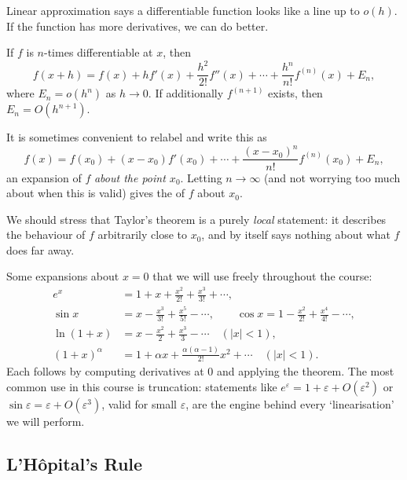 Linear approximation says a differentiable function looks like a line up to $o(h)$. If the function has more derivatives, we can do better.

\begin{theorem}
	If $f$ is $n$-times differentiable at $x$, then
	$$
	f(x + h) = f(x) + h f'(x) + \frac{h^2}{2!} f''(x) + \cdots + \frac{h^n}{n!} f^{(n)}(x) + E_n,
	$$
	where $E_n = o(h^n)$ as $h \to 0$. If additionally $f^{(n + 1)}$ exists, then $E_n = O(h^{n + 1})$.
\end{theorem}

It is sometimes convenient to relabel and write this as
$$
f(x) = f(x_0) + (x - x_0) f'(x_0) + \cdots + \frac{(x - x_0)^n}{n!} f^{(n)}(x_0) + E_n,
$$
an expansion of $f$ \emph{about the point $x_0$}. Letting $n \to \infty$ (and not worrying too much about when this is valid) gives the  of $f$ about $x_0$.

We should stress that Taylor's theorem is a purely \emph{local} statement: it describes the behaviour of $f$ arbitrarily close to $x_0$, and by itself says nothing about what $f$ does far away.

\begin{example}
	Some expansions about $x = 0$ that we will use freely throughout the course:
	\begin{align*}
		e^x &= 1 + x + \frac{x^2}{2!} + \frac{x^3}{3!} + \cdots, \\
		\sin x &= x - \frac{x^3}{3!} + \frac{x^5}{5!} - \cdots, \qquad \cos x = 1 - \frac{x^2}{2!} + \frac{x^4}{4!} - \cdots, \\
		\ln(1 + x) &= x - \frac{x^2}{2} + \frac{x^3}{3} - \cdots \quad (|x| < 1), \\
		(1 + x)^\alpha &= 1 + \alpha x + \frac{\alpha(\alpha - 1)}{2!}x^2 + \cdots \quad (|x| < 1).
	\end{align*}
	Each follows by computing derivatives at $0$ and applying the theorem. The most common use in this course is truncation: statements like $e^\varepsilon = 1 + \varepsilon + O(\varepsilon^2)$ or $\sin\varepsilon = \varepsilon + O(\varepsilon^3)$, valid for small $\varepsilon$, are the engine behind every `linearisation' we will perform.
\end{example}

\subsection{L'H\^opital's Rule}

